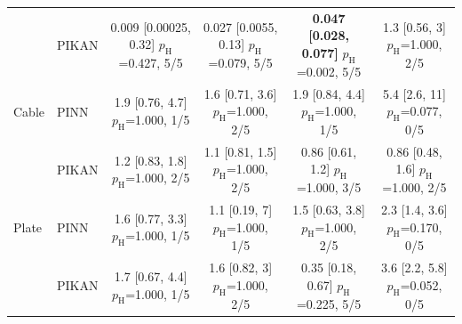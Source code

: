 \begin{tabular}{llcccc}
 & PIKAN & \makecell{0.009 [0.00025, 0.32]\\{\scriptsize $p_{\mathrm{H}}$=0.427, 5/5}} & \makecell{0.027 [0.0055, 0.13]\\{\scriptsize $p_{\mathrm{H}}$=0.079, 5/5}} & \makecell{\textbf{0.047 [0.028, 0.077]}\\{\scriptsize $p_{\mathrm{H}}$=0.002, 5/5}} & \makecell{1.3 [0.56, 3]\\{\scriptsize $p_{\mathrm{H}}$=1.000, 2/5}}\\
\addlinespace
Cable & PINN & \makecell{1.9 [0.76, 4.7]\\{\scriptsize $p_{\mathrm{H}}$=1.000, 1/5}} & \makecell{1.6 [0.71, 3.6]\\{\scriptsize $p_{\mathrm{H}}$=1.000, 2/5}} & \makecell{1.9 [0.84, 4.4]\\{\scriptsize $p_{\mathrm{H}}$=1.000, 1/5}} & \makecell{5.4 [2.6, 11]\\{\scriptsize $p_{\mathrm{H}}$=0.077, 0/5}}\\
 & PIKAN & \makecell{1.2 [0.83, 1.8]\\{\scriptsize $p_{\mathrm{H}}$=1.000, 2/5}} & \makecell{1.1 [0.81, 1.5]\\{\scriptsize $p_{\mathrm{H}}$=1.000, 2/5}} & \makecell{0.86 [0.61, 1.2]\\{\scriptsize $p_{\mathrm{H}}$=1.000, 3/5}} & \makecell{0.86 [0.48, 1.6]\\{\scriptsize $p_{\mathrm{H}}$=1.000, 2/5}}\\
\addlinespace
Plate & PINN & \makecell{1.6 [0.77, 3.3]\\{\scriptsize $p_{\mathrm{H}}$=1.000, 1/5}} & \makecell{1.1 [0.19, 7]\\{\scriptsize $p_{\mathrm{H}}$=1.000, 1/5}} & \makecell{1.5 [0.63, 3.8]\\{\scriptsize $p_{\mathrm{H}}$=1.000, 2/5}} & \makecell{2.3 [1.4, 3.6]\\{\scriptsize $p_{\mathrm{H}}$=0.170, 0/5}}\\
 & PIKAN & \makecell{1.7 [0.67, 4.4]\\{\scriptsize $p_{\mathrm{H}}$=1.000, 1/5}} & \makecell{1.6 [0.82, 3]\\{\scriptsize $p_{\mathrm{H}}$=1.000, 2/5}} & \makecell{0.35 [0.18, 0.67]\\{\scriptsize $p_{\mathrm{H}}$=0.225, 5/5}} & \makecell{3.6 [2.2, 5.8]\\{\scriptsize $p_{\mathrm{H}}$=0.052, 0/5}}\\
\bottomrule
\end{tabular}